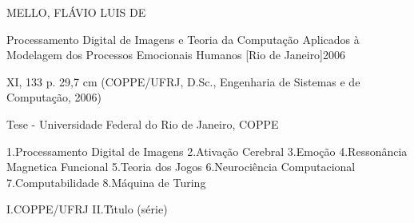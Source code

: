 \newlength{\quarentatt}
\settowidth{\quarentatt}{\ttfamily aaaaaaaaaaaaaaaaaaaaaaaaaaaaaaaaaaaaaaaa}
\newlength{\tabulacao}
\setlength{\tabulacao}{.43cm}
\vspace*{\fill}
{
	\ttfamily
	\begin{center}
		\parbox{\quarentatt}
		{
		\noindent
		MELLO, FLÁVIO LUIS DE

		\hspace{\tabulacao}
		Processamento Digital de Imagens e Teoria da Computação Aplicados à Modelagem dos Processos Emocionais Humanos [Rio de Janeiro]2006

		\hspace{\tabulacao}
		XI, 133 p. 29,7 cm (COPPE/UFRJ, D.Sc., Engenharia de Sistemas e de Computação, 2006)

		\hspace{\tabulacao}
		Tese - Uni\-ver\-si\-da\-de Fe\-de\-ral do Rio de Ja\-nei\-ro, COPPE


		1.Processamento Digital de Imagens
		2.Ativação Cerebral
		3.Emoção
		4.Ressonância Magnetica Funcional
		5.Teoria dos Jogos
		6.Neurociência Computacional
		7.Computabilidade
		8.Máquina de Turing


		\hspace{\tabulacao}
		I.COPPE/UFRJ
		\hspace{\tabulacao}
		II.T\'{\i}tulo (s\'erie)
		}
	\end{center}
}
\vspace*{\fill}
\pagebreak

